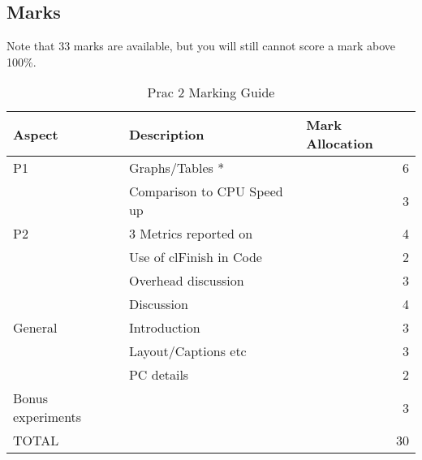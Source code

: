 \subsection{Marks}
Note that 33 marks are available, but you will still cannot score a mark above 100\%.
\begin{table}[H]
\centering
\caption{Prac 2 Marking Guide}
\label{tbl:Prac2Marks}
\begin{tabular}{|l|l|r|}
\hline
\textbf{Aspect} & \textbf{Description} & \multicolumn{1}{l|}{\textbf{Mark Allocation}} \\ \hline
P1 & Graphs/Tables * & 6 \\ \hline
 & Comparison to CPU Speed up & 3 \\ \hline
P2 & 3 Metrics reported on & 4 \\ \hline
 & Use of clFinish in Code & 2 \\ \hline
 & Overhead discussion & 3 \\ \hline
 & Discussion & 4 \\ \hline
General & Introduction & 3 \\ \hline
 & Layout/Captions etc & 3 \\ \hline
 & PC details & 2 \\ \hline
Bonus experiments &  & 3 \\ \hline
TOTAL &  & 30 \\ \hline
\end{tabular}
\end{table}